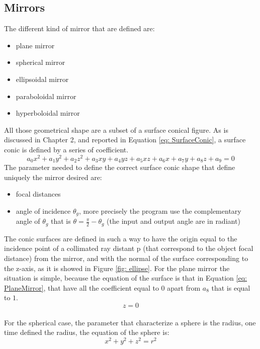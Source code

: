 \subsection{Mirrors}
The different kind of mirror that are defined are:
\begin{itemize}
\item plane mirror
\item spherical mirror
\item ellipsoidal mirror
\item paraboloidal mirror
\item hyperboloidal mirror
%
\end{itemize}
All those geometrical shape are a subset of a surface conical figure. As is discussed in Chapter 2, and reported in Equation \ref{eq: SurfaceConic}, a surface conic is defined by a series of coefficient.
\begin{equation}
a_0 x^2 + a_1 y^2 + a_2 z^2 + a_3 xy + a_4 yz + a_5 xz + a_6 x + a_7 y + a_8 z + a_9 = 0 
\label{eq: SurfaceConic}
\end{equation}
%
The parameter needed to define the correct surface conic shape that define uniquely the mirror desired are:
%
\begin{itemize}
\item focal distances
\item angle of incidence $\theta_g $, more precisely the program use the complementary angle of $\theta_g $ that is $\theta = \frac{\pi}{2} - \theta_g $ (the input and output angle are in radiant)
\end{itemize}
%
The conic surfaces are defined in such a way to have the origin equal to the incidence point of a collimated ray distant p (that correspond to the object focal distance) from the mirror, and with the normal of the surface corresponding to the z-axis, as it is showed in Figure \ref{fig: ellipse}.
For the plane mirror the situation is simple, because the equation of the surface is that in Equation \ref{eq: PlaneMirror}, that have all the coefficient equal to $0 $ apart from $a_8 $ that is equal to $1 $. 
%
\begin{equation}
z = 0
\label{eq: PlaneMirror}
\end{equation}
%
\\
For the spherical case, the parameter that characterize a sphere is the radius, one time defined the radius, the equation of the sphere is:
\begin{equation}
x^2 + y^2 + z^2 = r^2
\label{eq: sphere}
\end{equation}
